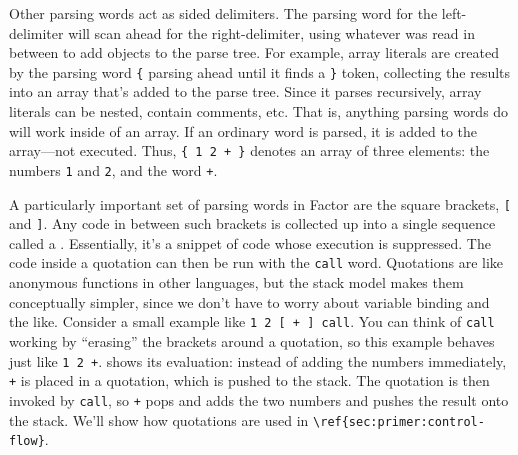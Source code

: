 Other parsing words act as sided delimiters.  The parsing word for the
left-delimiter will scan ahead for the right-delimiter, using whatever was read
in between to add objects to the parse tree.  For example, array literals are
created by the parsing word \lstinline|{| parsing ahead until it finds a
\lstinline|}| token, collecting the results into an array that's added to the
parse tree.  Since it parses recursively, array literals can be nested, contain
comments, etc.  That is, anything parsing words do will work
inside of an array.  If an ordinary word is parsed, it is added to the
array---not executed.  Thus, \lstinline|{ 1 2 + }| denotes an array of three
elements: the numbers \lstinline|1| and \lstinline|2|, and the word
\lstinline|+|.



A particularly important set of parsing words in Factor are the square
brackets, \lstinline|[| and \lstinline|]|.  Any code in between such brackets
is collected up into a single sequence called a .  Essentially,
it's a snippet of code whose execution is suppressed.  The code inside a
quotation can then be run with the \lstinline|call| word.  Quotations are like
anonymous functions in other languages, but the stack model makes them
conceptually simpler, since we don't have to worry about variable binding and
the like.  Consider a small example like \lstinline|1 2 [ + ] call|.  You can
think of \lstinline|call| working by ``erasing'' the brackets around a
quotation, so this example behaves just like \lstinline|1 2 +|.
 shows its evaluation: instead of adding the numbers
immediately, \lstinline|+| is placed in a quotation, which is pushed to the
stack.  The quotation is then invoked by \lstinline|call|, so \lstinline|+|
pops and adds the two numbers and pushes the result onto the stack.  We'll show
how quotations are used in \verb|\ref{sec:primer:control-flow}|.


